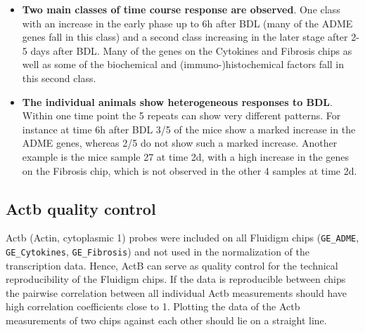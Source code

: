 \documentclass[]{article}
\begin{document}
\begin{itemize}
\itemsep1pt\parskip0pt
\item
  \textbf{Two main classes of time course response are observed}. One
  class with an increase in the early phase up to 6h after BDL (many of
  the ADME genes fall in this class) and a second class increasing in
  the later stage after 2-5 days after BDL. Many of the genes on the
  Cytokines and Fibrosis chips as well as some of the biochemical and
  (immuno-)histochemical factors fall in this second class.
\item
  \textbf{The individual animals show heterogeneous responses to BDL}.
  Within one time point the 5 repeats can show very different patterns.
  For instance at time 6h after BDL 3/5 of the mice show a marked
  increase in the ADME genes, whereas 2/5 do not show such a marked
  increase. Another example is the mice sample 27 at time 2d, with a
  high increase in the genes on the Fibrosis chip, which is not observed
  in the other 4 samples at time 2d.
\end{itemize}

\subsection{Actb quality control}\label{actb-quality-control}

Actb (Actin, cytoplasmic 1) probes were included on all Fluidigm chips
(\texttt{GE\_ADME}, \texttt{GE\_Cytokines}, \texttt{GE\_Fibrosis}) and
not used in the normalization of the transcription data. Hence, ActB can
serve as quality control for the technical reproducibility of the
Fluidigm chips. If the data is reproducible between chips the pairwise
correlation between all individual Actb measurements should have high
correlation coefficients close to 1. Plotting the data of the Actb
measurements of two chips against each other should lie on a straight
line.
\end{document}
